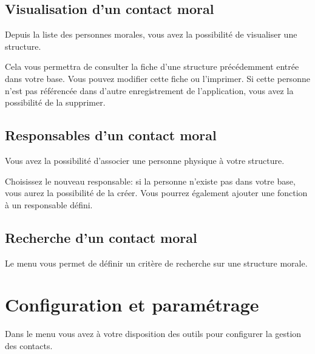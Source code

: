 \documentclass[a4paper,10pt,oneside,french]{sphinxmanual}
\begin{document}
\noindent{}


\subsection{Visualisation d’un contact moral}
\label{\detokenize{contacts/legal_entity:visualisation-d-un-contact-moral}}
Depuis la liste des personnes morales, vous avez la possibilité de visualiser une structure.

Cela vous permettra de consulter la fiche d’une structure précédemment entrée dans votre base. Vous pouvez modifier cette fiche ou l’imprimer. Si cette personne n’est pas référencée dans d’autre enregistrement de l’application, vous avez la possibilité de la supprimer.

\noindent{}


\subsection{Responsables d’un contact moral}
\label{\detokenize{contacts/legal_entity:responsables-d-un-contact-moral}}
Vous avez la possibilité d’associer une personne physique à votre structure.

Choisissez le nouveau responsable: si la personne n’existe pas dans votre base, vous aurez la possibilité de la créer. Vous pourrez également ajouter une fonction à un responsable défini.

\noindent{}


\subsection{Recherche d’un contact moral}
\label{\detokenize{contacts/legal_entity:recherche-d-un-contact-moral}}
Le menu  vous permet de définir un critère de recherche sur une structure morale.

\noindent{}


\section{Configuration et paramétrage}
\label{\detokenize{contacts/configuration:configuration-et-parametrage}}\label{\detokenize{contacts/configuration::doc}}
Dans le menu  vous avez à votre disposition des outils pour configurer la gestion des contacts.
\end{document}
